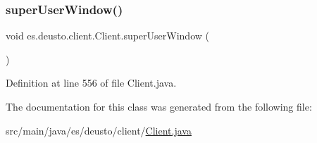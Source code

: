 \subsubsection{\texorpdfstring{super\+User\+Window()}{superUserWindow()}}
{\footnotesize\ttfamily void es.\+deusto.\+client.\+Client.\+super\+User\+Window (\begin{DoxyParamCaption}{ }\end{DoxyParamCaption})}



Definition at line 556 of file Client.\+java.



The documentation for this class was generated from the following file\+:\begin{DoxyCompactItemize}
\item 
src/main/java/es/deusto/client/\hyperlink{_client_8java}{Client.\+java}\end{DoxyCompactItemize}
